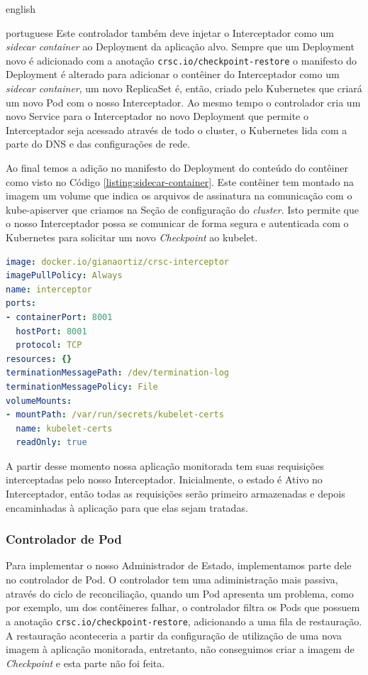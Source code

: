 \begin{otherlanguage*}{english}
\begin{otherlanguage*}{portuguese}
Este controlador também deve injetar o Interceptador como um \textit{sidecar container}
ao Deployment da aplicação alvo. Sempre que um Deployment novo é adicionado com a 
anotação \texttt{crsc.io/checkpoint-restore} o manifesto do Deployment é alterado
para adicionar o contêiner do Interceptador como um \textit{sidecar container}, um novo
ReplicaSet é, então, criado pelo Kubernetes que criará um novo Pod com o nosso
Interceptador. Ao mesmo tempo o controlador cria um novo Service para o Interceptador no
novo Deployment que permite o Interceptador seja acessado através de todo o cluster, o
Kubernetes lida com a parte do DNS e das configurações de rede.

Ao final temos a adição no manifesto do Deployment do conteúdo do contêiner como visto no
Código \ref{listing:sidecar-container}. Este contêiner tem montado na imagem um volume
que indica os arquivos de assinatura na comunicação com o kube-apiserver que criamos na
Seção de configuração do \textit{cluster}. Isto permite que o nosso Interceptador possa
se comunicar de forma segura e autenticada com o Kubernetes para solicitar um novo
\textit{Checkpoint} ao kubelet.

\begin{lstlisting}[language=yaml,caption={Configuração do Interceptador para o Deployment da aplicação alvo como sidecar container.},label={listing:sidecar-container}]
image: docker.io/gianaortiz/crsc-interceptor
imagePullPolicy: Always
name: interceptor
ports:
- containerPort: 8001
  hostPort: 8001
  protocol: TCP
resources: {}
terminationMessagePath: /dev/termination-log
terminationMessagePolicy: File
volumeMounts:
- mountPath: /var/run/secrets/kubelet-certs
  name: kubelet-certs
  readOnly: true
\end{lstlisting}

A partir desse momento nossa aplicação monitorada tem suas requisições interceptadas
pelo nosso Interceptador. Inicialmente, o estado é Ativo no Interceptador, então todas
as requisições serão primeiro armazenadas e depois encaminhadas à aplicação para que
elas sejam tratadas.

\subsubsection{Controlador de Pod}

Para implementar o nosso Administrador de Estado, implementamos parte dele no controlador
de Pod. O controlador tem uma adiministração mais passiva, através do ciclo de
reconciliação, quando um Pod apresenta um problema, como por exemplo, um dos contêineres
falhar, o controlador filtra os Pods que possuem a anotação
\texttt{crsc.io/checkpoint-restore}, adicionando a uma fila de restauração.
A restauração aconteceria a partir da configuração de utilização de uma nova
imagem à aplicação monitorada, entretanto, não conseguimos criar a imagem de
\textit{Checkpoint} e esta parte não foi feita.


\end{otherlanguage*}
\end{otherlanguage*}
